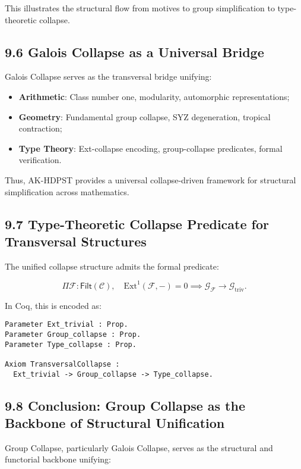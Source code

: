 \documentclass[11pt]{article}
\begin{document}
This illustrates the structural flow from motives to group simplification to type-theoretic collapse.

\subsection*{9.6 Galois Collapse as a Universal Bridge}

Galois Collapse serves as the transversal bridge unifying:

\begin{itemize}
    \item \textbf{Arithmetic}: Class number one, modularity, automorphic representations;
    \item \textbf{Geometry}: Fundamental group collapse, SYZ degeneration, tropical contraction;
    \item \textbf{Type Theory}: Ext-collapse encoding, group-collapse predicates, formal verification.
\end{itemize}

Thus, AK-HDPST provides a universal collapse-driven framework for structural simplification across mathematics.

\subsection*{9.7 Type-Theoretic Collapse Predicate for Transversal Structures}

The unified collapse structure admits the formal predicate:

\[
\Pi \mathcal{F} : \mathsf{Filt}(\mathcal{C}), \quad \mathrm{Ext}^1(\mathcal{F}, -) = 0 \implies \mathcal{G}_{\mathcal{F}} \longrightarrow \mathcal{G}_{\mathrm{triv}}.
\]

In Coq, this is encoded as:

\begin{lstlisting}[language=Coq]
Parameter Ext_trivial : Prop.
Parameter Group_collapse : Prop.
Parameter Type_collapse : Prop.

Axiom TransversalCollapse :
  Ext_trivial -> Group_collapse -> Type_collapse.
\end{lstlisting}

\subsection*{9.8 Conclusion: Group Collapse as the Backbone of Structural Unification}

Group Collapse, particularly Galois Collapse, serves as the structural and functorial backbone unifying:
\end{document}

